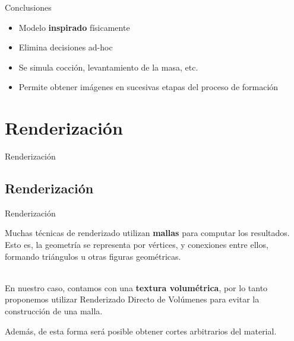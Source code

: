 \documentclass[spanish]{beamer}
\begin{document}
\begin{frame}{Conclusiones}
\begin{block}{}
\begin{itemize}
\item Modelo \textbf{inspirado} físicamente
\item Elimina decisiones ad-hoc
\item Se simula cocción, levantamiento de la masa, etc.
\item Permite obtener imágenes en sucesivas etapas del proceso de formación
\end{itemize}
\end{block}
\end{frame}

\section{Renderización}


\begin{frame}
\begin{block}{}
\begin{center}
\vspace{1cm}
\huge{Renderización}
\vspace{1cm}
\end{center}
\end{block}
\end{frame}


\subsection{Renderización}

\begin{frame}{Renderización}

Muchas técnicas de renderizado utilizan \textbf{mallas} para computar los resultados.
Esto es, la geometría se representa por vértices, y conexiones entre ellos, formando triángulos u otras figuras geométricas.

\ \\

En nuestro caso, contamos con una \textbf{textura volumétrica}, por lo tanto proponemos utilizar Renderizado Directo de Volúmenes para evitar la construcción de una malla.

Además, de esta forma será posible obtener cortes arbitrarios del material.

\end{frame}
\end{document}
